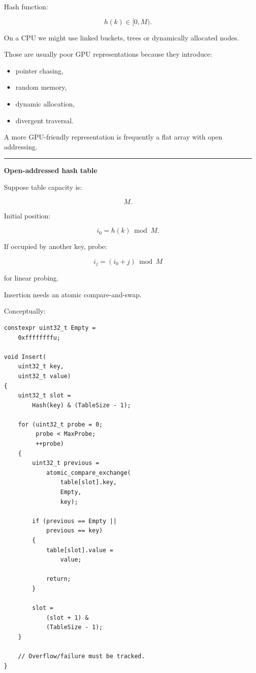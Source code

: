 Hash function:

\[
h(k)\in[0,M).
\]

On a CPU we might use linked buckets, trees or dynamically allocated nodes.

Those are usually poor GPU representations because they introduce:

\begin{itemize}
\tightlist
\item
  pointer chasing,
\item
  random memory,
\item
  dynamic allocation,
\item
  divergent traversal.
\end{itemize}

A more GPU-friendly representation is frequently a flat array with open addressing.

\begin{center}\rule{0.5\linewidth}{0.5pt}\end{center}

\textbf{Open-addressed hash table}

Suppose table capacity is:

\[
M.
\]

Initial position:

\[
i_0=h(k)\bmod M.
\]

If occupied by another key, probe:

\[
i_j=
(i_0+j)\bmod M
\]

for linear probing.

Insertion needs an atomic compare-and-swap.

Conceptually:

\protect{}\label{p10-hash-insert}%
\begin{verbatim}
constexpr uint32_t Empty =
    0xffffffffu;

void Insert(
    uint32_t key,
    uint32_t value)
{
    uint32_t slot =
        Hash(key) & (TableSize - 1);

    for (uint32_t probe = 0;
         probe < MaxProbe;
         ++probe)
    {
        uint32_t previous =
            atomic_compare_exchange(
                table[slot].key,
                Empty,
                key);

        if (previous == Empty ||
            previous == key)
        {
            table[slot].value =
                value;

            return;
        }

        slot =
            (slot + 1) &
            (TableSize - 1);
    }

    // Overflow/failure must be tracked.
}
\end{verbatim}

